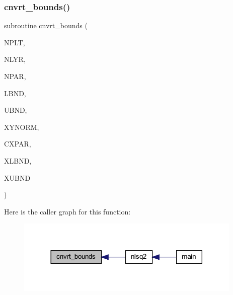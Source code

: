 \subsubsection{\texorpdfstring{cnvrt\+\_\+bounds()}{cnvrt\_bounds()}}
{\footnotesize\ttfamily subroutine cnvrt\+\_\+bounds (\begin{DoxyParamCaption}\item[{integer}]{N\+P\+LT,  }\item[{integer}]{N\+L\+YR,  }\item[{integer}]{N\+P\+AR,  }\item[{real, dimension(npar)}]{L\+B\+ND,  }\item[{real, dimension(npar)}]{U\+B\+ND,  }\item[{real, dimension(nplt)}]{X\+Y\+N\+O\+RM,  }\item[{integer, dimension(npar)}]{C\+X\+P\+AR,  }\item[{real, dimension(npar)}]{X\+L\+B\+ND,  }\item[{real, dimension(npar)}]{X\+U\+B\+ND }\end{DoxyParamCaption})}

Here is the caller graph for this function\+:\nopagebreak
\begin{figure}[H]
\begin{center}
\leavevmode
\includegraphics[width=305pt]{Leroi_8f90_a0801b4ca30057cb8ddfb94e49185a2ce_icgraph}
\end{center}
\end{figure}
\mbox{\label{Leroi_8f90_a36d9dbba0b5eada45705f561c0035c54}} 
